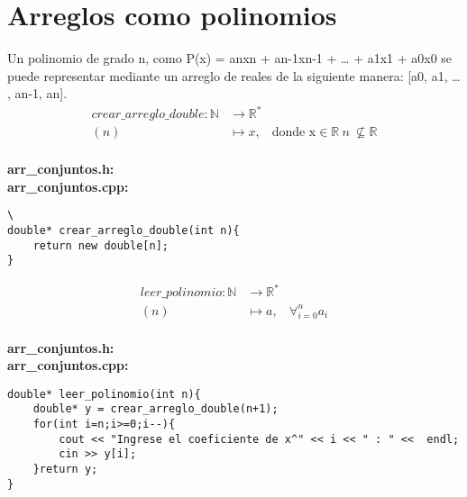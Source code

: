 \documentclass{article}
\theoremstyle{plain}
\theoremstyle{definition}
\begin{document}
\section{Arreglos como polinomios}
\begin{description}
Un polinomio de grado n, como P(x) = anxn + an-1xn-1 + … + a1x1 + a0x0 se puede representar mediante un arreglo de reales de la siguiente manera: [a0, a1, … , an-1, an].
%
\begin{align*}
crear\_arreglo\_double: \mathbb{N} &\to \mathbb{R}^*\\
(n) &\mapsto x,& \text{donde x} \in \mathbb{R} \ n\ \not\subseteq \mathbb{R}
\end{align*}\\
\textbf{arr\_conjuntos.h:}\ \\
\textbf{arr\_conjuntos.cpp:}\ 
%
\item[Codificación \textsf{C++}:]\hfill 
%
\begin{verbatim}\
double* crear_arreglo_double(int n){
    return new double[n];
}
\end{verbatim}
\begin{align*}
leer\_polinomio: \mathbb{N} &\to \mathbb{R}^*\\
(n) &\mapsto a,& \forall_{i=0}^{n} a_i
\end{align*}\\
\textbf{arr\_conjuntos.h:}\ \\
\textbf{arr\_conjuntos.cpp:}\ 
%
\item[Codificación \textsf{C++}:]\hfill 
%
\begin{verbatim}
double* leer_polinomio(int n){
    double* y = crear_arreglo_double(n+1);
    for(int i=n;i>=0;i--){
        cout << "Ingrese el coeficiente de x^" << i << " : " <<  endl;
        cin >> y[i];
    }return y;
}
\end{verbatim}
\end{description}
%
\end{document}
